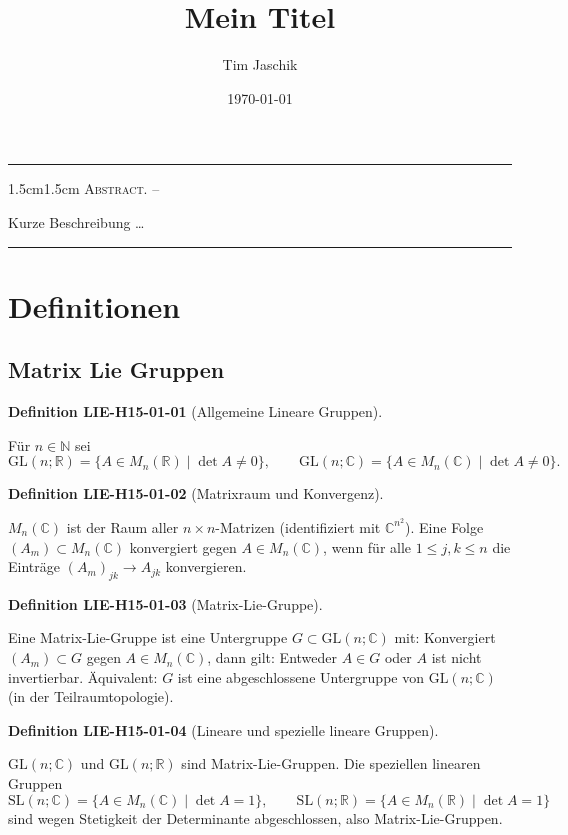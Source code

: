 \documentclass[10pt, letterpaper]{article}
\title{Mein Titel}
\author{Tim Jaschik}
\date{\today}
\newcommand{\R}{\mathbb{R}}
\newcommand{\C}{\mathbb{C}}
\newcommand{\GL}{\mathrm{GL}}
\newcommand{\SL}{\mathrm{SL}}
\renewenvironment{abstract}
  {
    \begin{adjustwidth}{1.5cm}{1.5cm}
    \small
    \textsc{Abstract. –}%
  }
  {
    \end{adjustwidth}
  }
\newcommand{\CustomHeading}[3]{%
  \par\medskip\noindent%
  \textbf{#1 #2} \textnormal{(#3)}.\enskip%
}
\newenvironment{DEF}[2]{\CustomHeading{Definition}{#1}{#2}}{}
\begin{document}
\maketitle
\rule{\textwidth}{0.5pt}
\begin{abstract}
Kurze Beschreibung …
\end{abstract}
\rule{\textwidth}{0.5pt}
\vspace{0.5cm}

\tableofcontents

\pagebreak

\section{Definitionen}

\subsection{Matrix Lie Gruppen}

\begin{DEF}{LIE-H15-01-01}{Allgemeine Lineare Gruppen}
Für $n\in\mathbb{N}$ sei
\[
\GL(n;\R)=\{A\in M_n(\R)\mid \det A\neq 0\},\qquad
\GL(n;\C)=\{A\in M_n(\C)\mid \det A\neq 0\}.
\]
\end{DEF}

\begin{DEF}{LIE-H15-01-02}{Matrixraum und Konvergenz}
$M_n(\C)$ ist der Raum aller $n\times n$-Matrizen (identifiziert mit $\C^{n^2}$).
Eine Folge $(A_m)\subset M_n(\C)$ konvergiert gegen $A\in M_n(\C)$, wenn für alle $1\le j,k\le n$ die Einträge $(A_m)_{jk}\to A_{jk}$ konvergieren.
\end{DEF}

\begin{DEF}{LIE-H15-01-03}{Matrix-Lie-Gruppe}
Eine Matrix-Lie-Gruppe ist eine Untergruppe $G\subset \GL(n;\C)$ mit:
Konvergiert $(A_m)\subset G$ gegen $A\in M_n(\C)$, dann gilt: Entweder $A\in G$ oder $A$ ist nicht invertierbar.
Äquivalent: $G$ ist eine abgeschlossene Untergruppe von $\GL(n;\C)$ (in der Teilraumtopologie).
\end{DEF}

\begin{DEF}{LIE-H15-01-04}{Lineare und spezielle lineare Gruppen}
$\GL(n;\C)$ und $\GL(n;\R)$ sind Matrix-Lie-Gruppen.
Die speziellen linearen Gruppen
\[
\SL(n;\C)=\{A\in M_n(\C)\mid \det A=1\},\qquad
\SL(n;\R)=\{A\in M_n(\R)\mid \det A=1\}
\]
sind wegen Stetigkeit der Determinante abgeschlossen, also Matrix-Lie-Gruppen.
\end{DEF}
\end{document}
